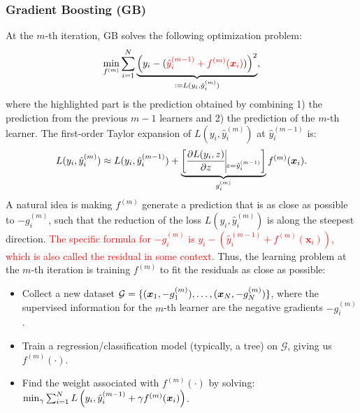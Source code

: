         
        
        
\subsubsection{Gradient Boosting (GB)}
        At the $m$-th iteration, GB solves the following optimization problem:
            \begin{equation}\label{XGBoost-model}
                \min_{f^{(m)}} \sum_{i=1}^{N}{
                    \underbrace{\left( y_i - (\textcolor{red}{\hat{y}^{(m-1)}_i + f^{(m)}(\bm{x}_i) } )  \right)^2}_{:=L(y_i, \hat{y}_i^{(m)}) },
                }
            \end{equation}
        where the highlighted part is the prediction obtained by combining 1) the prediction from the previous $m-1$ learners and 2) the prediction of the $m$-th learner. 
        The first-order Taylor expansion of $L(y_i, \hat{y}_i^{(m)})$ at $\hat{y}_i^{(m-1)}$ is:
            \begin{equation}
                L(y_i, \hat{y}_i^{(m)}) \approx L(y_i, \hat{y}_i^{(m-1)}) + \underbrace{\left[ \frac{\partial L(y_i, z)}{\partial z}\vline_{z = \hat{y}_i^{(m-1)}} \right]}_{g_{i}^{(m)}}  f^{(m)}(\bm{x}_i).
            \end{equation}
        A natural idea is making $f^{(m)}$ generate a prediction that is as close as possible to $-g^{(m)}_i$, such that the reduction of the loss $L(y_i, \hat{y}_i^{(m)})$ is along the steepest direction.
        \textcolor{red}{The specific formula for $-g^{(m)}_i$ is $y_i - \left( \hat{y}_i^{(m-1)} + f^{(m)}(\bm{x}_i)  \right)$, which is also called the residual in some context.}
        Thus, the learning problem  at the $m$-th iteration is training $f^{(m)}$ to fit the residuals as close as possible:
            \begin{itemize}
                \item  Collect a new dataset $\mathcal{G}=\{ (\bm{x}_1, -g^{(m)}_1), \ldots, (\bm{x}_N, -g^{(m)}_N) \}$, where the supervised information for the $m$-th learner are the negative gradients $-g_i^{(m)}$.
                \item  Train a regression/classification model (typically, a tree) on $\mathcal{G}$, giving us $f^{(m)}(\cdot)$. 
                \item  Find the weight associated with $f^{(m)}(\cdot)$ by solving: $\min_{\gamma} \sum_{i=1}^{N}{L\left(y_i, \hat{y}_i^{(m-1)} + \gamma f^{(m)}(\bm{x}_i)\right)}$.
            \end{itemize}


